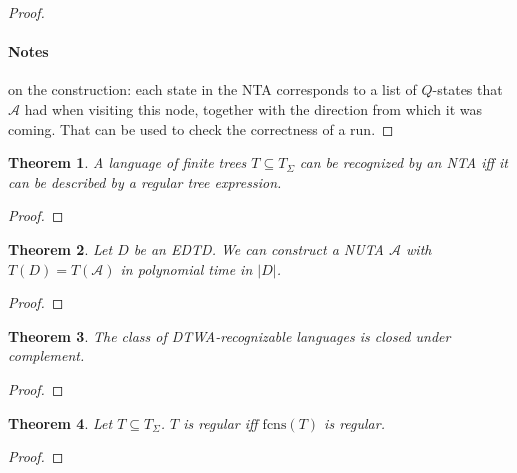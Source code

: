 \documentclass{article}
\newtheorem{theorem}{Theorem}
\begin{document}
\begin{proof}
	\paragraph{Notes} on the construction: each state in the NTA corresponds to a list of $Q$-states that $\mathcal{A}$ had when visiting this node, together with the direction from which it was coming. That can be used to check the correctness of a run.
\end{proof}

\begin{theorem}
\label{tre_fromto_nta}
	A language of finite trees $T \subseteq T_\Sigma$ can be recognized by an NTA iff it can be described by a regular tree expression.
\end{theorem}
\begin{proof}
\end{proof}

\begin{theorem}
\label{edtd_complto_nuta}
	Let $D$ be an EDTD. We can construct a NUTA $\mathcal{A}$ with $T(D) = T(\mathcal{A})$ in polynomial time in $|D|$.
\end{theorem}
\begin{proof}
\end{proof}

\begin{theorem}
\label{dtwa_complement}
	The class of DTWA-recognizable languages is closed under complement.
\end{theorem}
\begin{proof}
\end{proof}

\begin{theorem}
\label{fcns_correct}
	Let $T \subseteq T_\Sigma$. $T$ is regular iff $\text{fcns}(T)$ is regular.
\end{theorem}
\begin{proof}
\end{proof}
\end{document}
